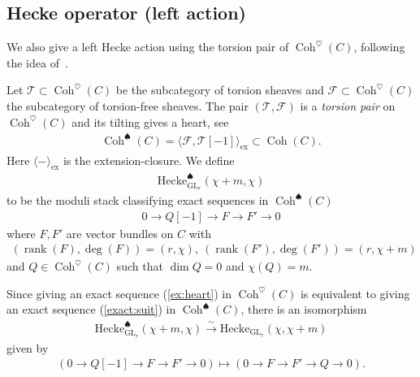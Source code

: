 \documentclass [11pt,oneside,a4paper,mathscr]{amsart}
\theoremstyle{definition}
\newcommand{\rank}{\operatorname{rank}}
\newcommand{\Coh}{\operatorname{Coh}}
\newcommand{\GL}{\operatorname{GL}}
\begin{document}
    \subsection{Hecke operator (left action)}
We also give a left Hecke action using the torsion pair of $\Coh^{\heartsuit}(C)$, 
following the idea of~\cite{DiaconescuPortaSala2022}. 
    
    Let $\mathcal{T} \subset \Coh^{\heartsuit}(C)$ be
    the subcategory of torsion sheaves and $\mathcal{F} \subset 
    \Coh^{\heartsuit}(C)$ the subcategory of torsion-free sheaves. 
    The pair $(\mathcal{T}, \mathcal{F})$ is a \textit{torsion pair} on 
    $\Coh^{\heartsuit}(C)$ and its tilting gives a heart, see~\cite{HRS}
    \begin{align*}
        \Coh^{\spadesuit}(C)=\langle \mathcal{F}, \mathcal{T}[-1] \rangle_{\mathrm{ex}} \subset \Coh(C). 
    \end{align*}
    Here $\langle -\rangle_{\mathrm{ex}}$ is the extension-closure. 
    We define 
    \begin{align*}
   \mathrm{Hecke}_{\GL_r}^{\spadesuit}(\chi+m, \chi)
    \end{align*}
    to be the moduli stack classifying exact sequences in 
    $\Coh^{\spadesuit}(C)$
    \begin{align}\label{exact:suit}
        0 \to Q[-1] \to F \to F' \to 0
    \end{align}
    where $F, F'$ are vector bundles on $C$ with 
    \begin{align*}(\rank(F), \deg(F))=(r, \chi), \ 
    (\rank(F'), \deg(F'))=(r, \chi+m)
    \end{align*}
    and $Q \in \Coh^{\heartsuit}(C)$ such that $\dim Q=0$ and $\chi(Q)=m$. 
    
    Since giving an exact sequence (\ref{ex:heart}) in $\Coh^{\heartsuit}(C)$ 
    is equivalent to giving 
    an exact sequence (\ref{exact:suit}) in $\Coh^{\spadesuit}(C)$, 
    there is an isomorphism
    \begin{align*}
       \mathrm{Hecke}_{\GL_r}^{\spadesuit}(\chi+m, \chi) \stackrel{\sim}{\to} 
        \mathrm{Hecke}_{\GL_r}(\chi, \chi+m)
    \end{align*}
    given by 
    \begin{align*}
        (0\to Q[-1] \to F\to F'\to 0) \mapsto (0\to F\to F' \to Q \to 0).
    \end{align*}
    
\end{document}
